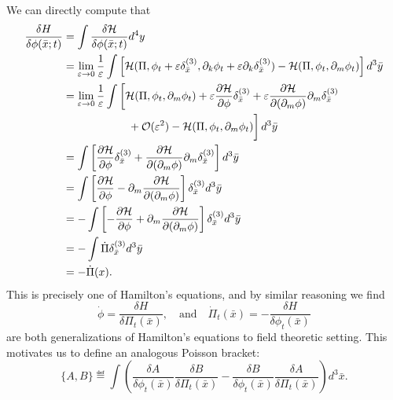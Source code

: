 We can directly compute that
\begin{subequations}
\begin{align}\allowdisplaybreaks
\frac{\delta H}{\delta\phi(\bar{x};t)} &= \int \frac{\delta\mathcal{H}}{\delta\phi(\bar{x};t)}d^{4}y\\
&= \lim_{\varepsilon\to0}\frac{1}{\varepsilon}\int\left[\mathcal{H}(\Pi,\phi_{t}+\varepsilon\delta^{(3)}_{\bar{x}},\partial_{k}\phi_{t}+\varepsilon\partial_{k}\delta^{(3)}_{\bar{x}})-\mathcal{H}(\Pi,\phi_{t},\partial_{m}\phi_{t})\right]d^{3}\bar{y}\\
&=\lim_{\varepsilon\to0}\frac{1}{\varepsilon}\int\left[\mathcal{H}(\Pi,\phi_{t},\partial_{m}\phi_{t})+\varepsilon\frac{\partial\mathcal{H}}{\partial\phi}\delta_{\bar{x}}^{(3)}+\varepsilon\frac{\partial\mathcal{H}}{\partial(\partial_{m}\phi)}\partial_{m}\delta_{\bar{x}}^{(3)}\right.\\\nonumber
&\left.\phantom{\lim_{\varepsilon\to0}\frac{1}{\varepsilon}\int\qquad}
+\mathcal{O}(\varepsilon^{2})-\mathcal{H}(\Pi,\phi_{t},\partial_{m}\phi_{t})\right]d^{3}\bar{y}\\
&=\int\left[\frac{\partial\mathcal{H}}{\partial\phi}\delta^{(3)}_{\bar{x}}+\frac{\partial\mathcal{H}}{\partial(\partial_{m}\phi)}\partial_{m}\delta^{(3)}_{\bar{x}}\right]d^{3}\bar{y}\\
&=\int\left[\frac{\partial\mathcal{H}}{\partial\phi}-\partial_{m}\frac{\partial\mathcal{H}}{\partial(\partial_{m}\phi)}\right]\delta^{(3)}_{\bar{x}}d^{3}\bar{y}\\
&=-\int\left[-\frac{\partial\mathcal{H}}{\partial\phi}+\partial_{m}\frac{\partial\mathcal{H}}{\partial(\partial_{m}\phi)}\right]\delta^{(3)}_{\bar{x}}d^{3}\bar{y}\\
&=-\int\dot{\Pi}\delta^{(3)}_{\bar{x}}d^{3}\bar{y}\\
&=-\dot{\Pi}(x).
\end{align}
\end{subequations}
This is precisely one of Hamilton's equations, and by similar
reasoning we find
\begin{equation}%
\dot{\phi} = \frac{\delta
  H}{\delta\Pi_{t}(\bar{x})},\quad\text{and}\quad\dot{\Pi}_{t}(\bar{x})=-\frac{\delta H}{\delta\phi_{t}(\bar{x})}
\end{equation}
are both generalizations of Hamilton's equations to field
theoretic setting. This motivates us to define an analogous
Poisson bracket:
\begin{equation}%
\{A,B\}\eqdef\int\left(\frac{\delta A}{\delta\phi_{t}(\bar{x})}\frac{\delta B}{\delta\Pi_{t}(\bar{x})}-\frac{\delta B}{\delta\phi_{t}(\bar{x})}\frac{\delta A}{\delta\Pi_{t}(\bar{x})}\right)d^{3}\bar{x}.
\end{equation}
